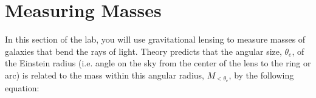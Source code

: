 %
%
%
%
%
%
%	
%	
%

\section{Measuring Masses}

In this section of the lab, you will use gravitational lensing to measure masses of galaxies that bend the rays of light.  Theory predicts that the angular size, $\theta_e$, of the Einstein radius (i.e. angle on the sky from the center of the lens to the ring or arc) is related to the mass within this angular radius, $M_{<\theta_e}$, by the following equation:

